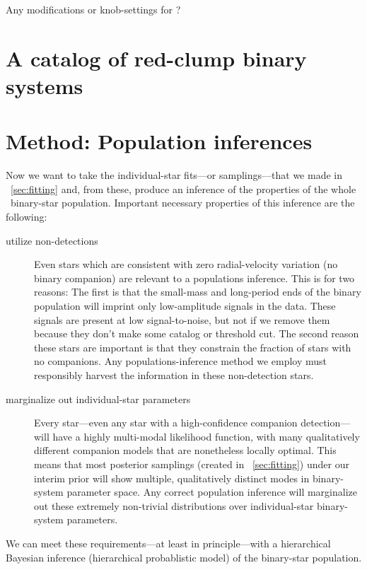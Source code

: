 \documentclass[modern, letterpaper]{aastex61}
\newcommand{\thejoker}{\project{The~Joker}}
\newcommand{\RC}{\acronym{RC}}
\begin{document}
Any modifications or knob-settings for \thejoker?

\section{A catalog of red-clump binary systems}

\section{Method: Population inferences}\label{sec:popinference}

Now we want to take the individual-star fits---or samplings---that
we made in \sectionname~\ref{sec:fitting} and, from these, produce
an inference of the properties of the whole \RC\ binary-star population.
Important necessary properties of this inference are the following:
\begin{description}
\item[utilize non-detections] Even stars which are consistent with
  zero radial-velocity variation (no binary companion) are relevant to
  a populations inference. This is for two reasons: The first is that
  the small-mass and long-period ends of the binary population will
  imprint only low-amplitude signals in the data. These signals are
  present at low signal-to-noise, but not if we remove them because
  they don't make some catalog or threshold cut. The second reason
  these stars are important is that they constrain the fraction of
  stars with no companions. Any populations-inference method we employ
  must responsibly harvest the information in these non-detection
  stars.
\item[marginalize out individual-star parameters] Every star---even
  any star with a high-confidence companion detection---will have a
  highly multi-modal likelihood function, with many qualitatively
  different companion models that are nonetheless locally
  optimal. This means that most posterior samplings (created in
  \sectionname~\ref{sec:fitting}) under our interim prior will show
  multiple, qualitatively distinct modes in binary-system parameter
  space.  Any correct population inference will marginalize out these
  extremely non-trivial distributions over individual-star
  binary-system parameters.
\end{description}
We can meet these requirements---at least in principle---with a
hierarchical Bayesian inference (hierarchical probablistic model) of
the binary-star population.
\end{document}
